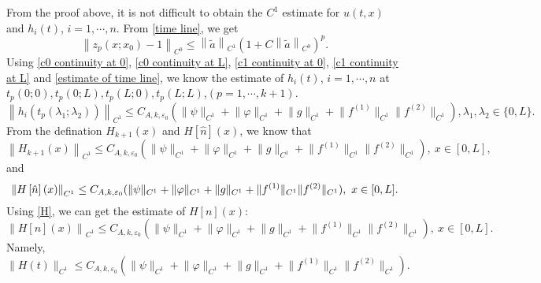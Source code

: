 \documentclass[a4paper,reqno,11pt]{amsart}
\numberwithin{equation}{section} %
\begin{document}
From the proof above, it is not difficult to obtain the $C^1$ estimate for $u(t,x)$ and $h_i(t)$, $i=1,\cdots,n$.
From \eqref{time line}, we get
\begin{equation}\label{estimate of time line}
\left\| z_p\left( x;x_0 \right) -1 \right\| _{C^0}\le \left\| \tilde{a} \right\| _{C^1}\left( 1+C\left\| \tilde{a} \right\| _{C^0} \right) ^p.
\end{equation}
Using \eqref{c0 continuity at 0}, \eqref{c0 continuity at L}, \eqref{c1 continuity at 0}, \eqref{c1 continuity at L} and \eqref{estimate of time line}, we know the estimate of $h_i(t)$, $i=1,\cdots,n$ at $t_p(0;0),t_p(0;L),t_p(L;0),t_p(L;L)$,$(p=1,\cdots,k+1)$.
\begin{equation}\label{estimate of h_i at t_p}
	\left\| h_i(t_p(\lambda _1;\lambda _2)) \right\|_{C^1} \leq C_{A,k,\varepsilon _0}(\lVert \psi \rVert _{C^1}+\lVert \varphi  \rVert _{C^1}+  \lVert g \rVert _{C^1}+\lVert f^{(1)} \rVert _{C^1}\lVert f^{(2)} \rVert _{C^1}) ,\lambda _1,\lambda _2 \in \{ 0,L \} .
\end{equation}
From the defination $H_{k+1}(x)$ and $H\left[ \hat{n} \right] \left( x \right)$, we know that
\begin{equation}\label{estimate of H}
	\left\| H_{k+1}(x) \right\|_{C^1} \leq C_{A,k,\varepsilon _0}(\lVert \psi \rVert _{C^1}+\lVert \varphi  \rVert _{C^1}+  \lVert g \rVert _{C^1}+\lVert f^{(1)} \rVert _{C^1}\lVert f^{(2)} \rVert _{C^1}) ,\ x\in [0,L],
\end{equation}
and
\begin{equation}\label{estimate of hat{H}}
	\left\| H\left[ \hat{n} \right] \left( x \right) \right\|_{C^1} \leq C_{A,k,\varepsilon _0}(\lVert \psi \rVert _{C^1}+\lVert \varphi  \rVert _{C^1}+  \lVert g \rVert _{C^1}+\lVert f^{(1)} \rVert _{C^1}\lVert f^{(2)} \rVert _{C^1}) ,\ x\in [0,L].
\end{equation}
Using \eqref{H}, we can get the estimate of $H\left[ n \right] \left( x \right)$:
\begin{equation}\label{estimate of H[n]}
	\left\| H\left[ n \right] \left( x \right) \right\|_{C^1} \leq C_{A,k,\varepsilon _0}(\lVert \psi \rVert _{C^1}+\lVert \varphi  \rVert _{C^1}+  \lVert g \rVert _{C^1}+\lVert f^{(1)} \rVert _{C^1}\lVert f^{(2)} \rVert _{C^1}) ,\ x\in [0,L].
\end{equation}
Namely, 
\begin{equation}\label{estimate of h}	
\lVert H(t) \rVert _{C^1}  \leq C_{A,k,\varepsilon _0}(\lVert \psi \rVert _{C^1}+\lVert \varphi  \rVert _{C^1}+  \lVert g \rVert _{C^1}+\lVert f^{(1)} \rVert _{C^1}\lVert f^{(2)} \rVert _{C^1}).
\end{equation}
\end{document}
